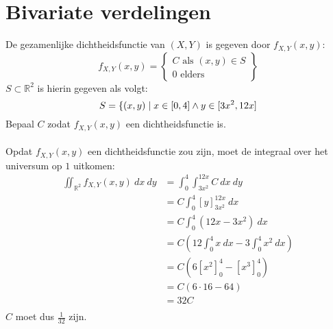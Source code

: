 \documentclass[main.tex]{subfiles}
\begin{document}
\section{Bivariate verdelingen}
\label{sec:bivar-verd}

\begin{oef}
  De gezamenlijke dichtheidsfunctie van $(X,Y)$ is gegeven door $f_{X,Y}(x,y)$:
  \[
  f_{X,Y}(x,y) = 
  \left\{
    \begin{array}{rl}
      C \text{ als } (x,y) \in S\\
      0 \text{ elders}
    \end{array}
  \right\}
  \]
  $S \subset \mathbb{R}^{2}$ is hierin gegeven als volgt:
  \[ S = \{(x,y) \mid x\in \interval{0}{4} \wedge y \in \interval{3x^{2}}{12x} \]
  Bepaal $C$ zodat $f_{X,Y}(x,y)$ een dichtheidsfunctie is.\\\\
  Opdat $f_{X,Y}(x,y)$ een dichtheidsfunctie zou zijn, moet de integraal over het universum op $1$ uitkomen:
  \[
  \begin{array}{rl}
    \iint_{\mathbb{R}^{2}}f_{X,Y}(x,y)\ dx\ dy
    &= \int_{0}^{4}\int_{3x^{2}}^{12x}C\ dx\ dy\\
    &= C\int_{0}^{4}\left[ y \right]_{3x^{2}}^{12x}\ dx\\
    &= C\int_{0}^{4}\left( 12x - 3x^{2} \right)\ dx\\
    &= C\left( 12\int_{0}^{4}x \ dx - 3\int_{0}^{4}x^{2} \ dx\right)\\
    &= C\left( 6\left[ x^{2} \right]_{0}^{4} - \left[x^{3}\right]_{0}^{4} \right)\\
    &= C\left( 6 \cdot 16 - 64 \right)\\
    &= 32C \\
  \end{array}
  \]
  $C$ moet dus $\frac{1}{32}$ zijn.
\end{oef}
\end{document}
